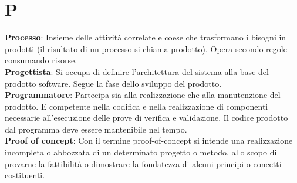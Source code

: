 \section{P}
\textbf{Processo}: Insieme delle attività correlate e coese che trasformano i bisogni in prodotti (il risultato di un processo si
chiama prodotto). Opera secondo regole consumando risorse.\\
\textbf{Progettista}: Si occupa di definire l'architettura del sistema alla base del prodotto software. Segue la fase dello sviluppo del prodotto.\\
\textbf{Programmatore}: Partecipa sia alla realizzazione che alla manutenzione del prodotto. E competente nella codifica e nella realizzazione di componenti necessarie all’esecuzione delle prove di verifica e validazione. Il codice prodotto dal
programma deve essere mantenibile nel tempo.\\
\textbf{Proof of concept}: Con il termine proof-of-concept si intende una realizzazione incompleta o abbozzata di un determinato progetto o metodo, allo scopo di provarne la fattibilità o dimostrare la fondatezza di alcuni principi o concetti costituenti.\\
